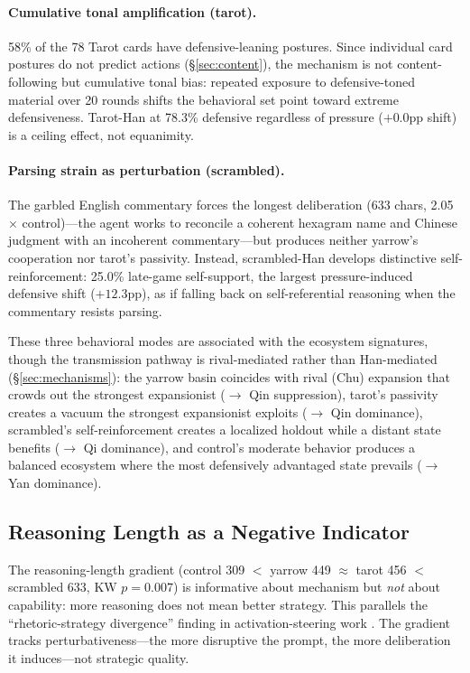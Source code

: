 \documentclass[11pt]{article}
\begin{document}
\paragraph{Cumulative tonal amplification (tarot).} 58\% of the 78 Tarot cards have defensive-leaning postures. Since individual card postures do not predict actions (\S\ref{sec:content}), the mechanism is not content-following but cumulative tonal bias: repeated exposure to defensive-toned material over 20 rounds shifts the behavioral set point toward extreme defensiveness. Tarot-Han at 78.3\% defensive regardless of pressure ($+0.0$pp shift) is a ceiling effect, not equanimity.

\paragraph{Parsing strain as perturbation (scrambled).} The garbled English commentary forces the longest deliberation (633 chars, 2.05$\times$ control)---the agent works to reconcile a coherent hexagram name and Chinese judgment with an incoherent commentary---but produces neither yarrow's cooperation nor tarot's passivity. Instead, scrambled-Han develops distinctive self-reinforcement: 25.0\% late-game self-support, the largest pressure-induced defensive shift ($+12.3$pp), as if falling back on self-referential reasoning when the commentary resists parsing.

These three behavioral modes are associated with the ecosystem signatures, though the transmission pathway is rival-mediated rather than Han-mediated (\S\ref{sec:mechanisms}): the yarrow basin coincides with rival (Chu) expansion that crowds out the strongest expansionist ($\to$ Qin suppression), tarot's passivity creates a vacuum the strongest expansionist exploits ($\to$ Qin dominance), scrambled's self-reinforcement creates a localized holdout while a distant state benefits ($\to$ Qi dominance), and control's moderate behavior produces a balanced ecosystem where the most defensively advantaged state prevails ($\to$ Yan dominance).

\subsection{Reasoning Length as a Negative Indicator}

The reasoning-length gradient (control 309 $<$ yarrow 449 $\approx$ tarot 456 $<$ scrambled 633, KW $p = 0.007$) is informative about mechanism but \emph{not} about capability: more reasoning does not mean better strategy. This parallels the ``rhetoric-strategy divergence'' finding in activation-steering work \citep{Sun2026persona}. The gradient tracks perturbativeness---the more disruptive the prompt, the more deliberation it induces---not strategic quality.
\end{document}

